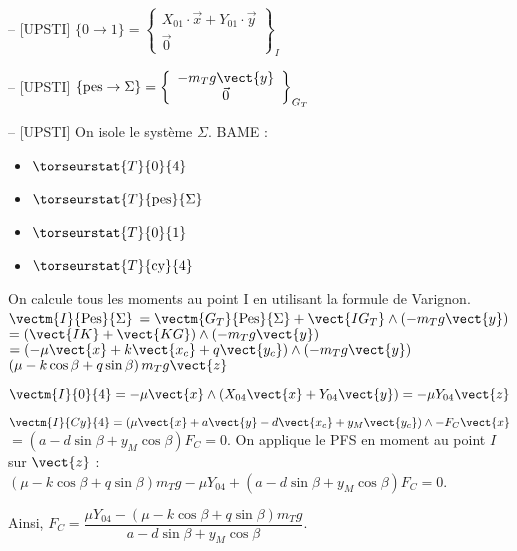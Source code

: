 \ifprof
\begin{corrige}-- [UPSTI]
$\{0 \rightarrow 1\}=\left\{\begin{array}{c}
X_{01} \cdot \vec{x}+Y_{01} \cdot \vec{y} \\
\vec{0}
\end{array}\right\}_{I}
$
\end{corrige}
\else
\fi

\ifprof
\begin{corrige}-- [UPSTI]
$\{\text{pes} \rightarrow \Sigma \}=\left\{\begin{array}{c}
-m_T g\vect{y}  \\
\vec{0}
\end{array}\right\}_{G_T}
$

\end{corrige}
\else
\fi

\ifprof
\begin{corrige}-- [UPSTI]
On isole le système ${\Sigma}$.
BAME :
\begin{itemize}
\item $\torseurstat{T}{0}{4}$
\item $\torseurstat{T}{\text{pes}}{\Sigma}$
\item $\torseurstat{T}{0}{1}$
\item $\torseurstat{T}{\text{cy}}{4}$
\end{itemize}

On calcule tous les moments au point I en utilisant la formule de Varignon.
$\vectm{I}{\text{Pes}}{\Sigma} $
$= \vectm{G_T}{\text{Pes}}{\Sigma} + \vect{IG_T}\wedge \left(-m_T g\vect{y}\right)$
$=\left(\vect{IK}+\vect{KG}\right) \wedge \left(-m_T g\vect{y}\right)$
$ = \left(-\mu \vect{x} + k\vect{x_c}+q\vect{y_c}\right) \wedge \left(-m_T g\vect{y}\right)$
$\left(\mu -k\cos\beta+q\sin\beta \right) m_T g\vect{z}$

$\vectm{I}{0}{4} = -\mu \vect{x} \wedge \left(X_{04}\vect{x}+Y_{04}\vect{y}\right) =-\mu Y_{04}\vect{z}$

$\vectm{I}{Cy}{4} =\left(\mu \vect{x} + a\vect{y} - d\vect{x_c} +y_M \vect{y_c}\right) \wedge -F_C\vect{x}$
$=(a-d\sin\beta +y_M \cos\beta) F_C = 0$.
On applique le PFS en moment au point $I$ sur $\vect{z}$ : 
$\left(\mu -k\cos\beta+q\sin\beta \right) m_T g - \mu Y_{04}+\left(a-d\sin\beta +y_M \cos\beta\right) F_C = 0$.

Ainsi, $F_C=\dfrac{\mu Y_{04}-(\mu -k\cos\beta +q\sin\beta) m_T g}{a-d\sin\beta+y_M \cos\beta}$.

\end{corrige}
\else
\fi

